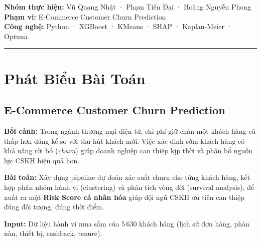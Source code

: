 \documentclass[12pt,a4paper]{article}
\begin{document}

\begin{center}
  {\bfseries Nhóm thực hiện:} Vũ Quang Nhật · Phạm Tiến Đại · Hoàng Nguyễn Phong\\
  {\bfseries Phạm vi:} E-Commerce Customer Churn Prediction\\
  {\bfseries Công nghệ:} Python · XGBoost · KMeans · SHAP · Kaplan-Meier · Optuna
\end{center}

\rule{\textwidth}{0.4pt}

\newpage
\tableofcontents
\newpage

\section{Phát Biểu Bài Toán}

\subsection{E-Commerce Customer Churn Prediction}

\textbf{Bối cảnh:}
Trong ngành thương mại điện tử, chi phí giữ chân một khách hàng cũ thấp hơn đáng kể so với thu
hút khách mới. Việc xác định sớm khách hàng có khả năng rời bỏ (\textit{churn}) giúp doanh nghiệp
can thiệp kịp thời và phân bổ nguồn lực CSKH hiệu quả hơn.

\textbf{Bài toán:}
Xây dựng pipeline dự đoán xác suất churn cho từng khách hàng, kết hợp phân nhóm hành vi
(clustering) và phân tích vòng đời (survival analysis), để xuất ra một \textbf{Risk Score cá nhân
hóa} giúp đội ngũ CSKH ưu tiên can thiệp đúng đối tượng, đúng thời điểm.

\textbf{Input:} Dữ liệu hành vi mua sắm của 5\,630 khách hàng (lịch sử đơn hàng, phàn nàn, thiết
bị, cashback, tenure).
\end{document}

